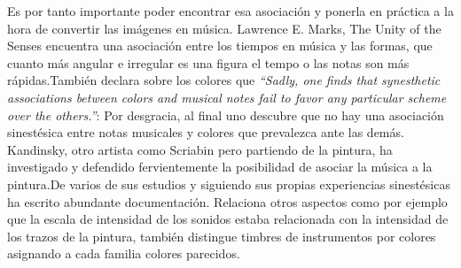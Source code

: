  Es por tanto importante poder encontrar esa asociación y ponerla en práctica a la hora de convertir las imágenes en música. Lawrence E. Marks, The Unity of the Senses encuentra una asociación entre los tiempos en música y las formas, que cuanto más angular e irregular es una figura el tempo o las notas son más rápidas.También declara sobre los colores que \emph{``Sadly, one finds that synesthetic associations between colors and musical notes fail to favor any particular scheme over the others.''}: Por desgracia, al final uno descubre que no hay una asociación sinestésica entre notas musicales y colores que prevalezca ante las demás.\\

Kandinsky, otro artista como Scriabin pero partiendo de la pintura, ha investigado y defendido fervientemente la posibilidad de asociar la música a la pintura.De varios de sus estudios y siguiendo sus propias experiencias sinestésicas ha escrito abundante documentación. Relaciona otros aspectos como por ejemplo que la escala de intensidad de los sonidos estaba relacionada con la intensidad de los trazos de la pintura, también distingue timbres de instrumentos por colores asignando a cada familia colores parecidos. \\
